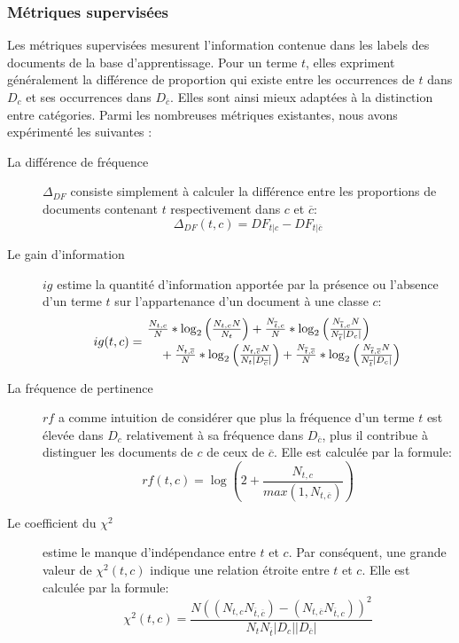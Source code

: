 \subsubsection{Métriques supervisées}
\label{sec:quanta:poids-globaux-superv}
Les métriques supervisées mesurent l'information contenue dans les labels des documents de la base d'apprentissage. Pour un terme $t$, elles expriment généralement la différence de proportion qui existe entre les occurrences de $t$ dans $D_c$ et ses occurrences dans $D_{\overline{c}}$. Elles sont ainsi mieux adaptées à la distinction entre catégories. Parmi les nombreuses métriques existantes, nous avons expérimenté les suivantes : 
\begin{description}
	\item[La différence de fréquence] $\Delta_{DF}$ consiste simplement à calculer la différence entre les proportions de documents contenant $t$ respectivement dans $c$ et $\overline{c}$:
	\[\Delta_{DF}(t,c) = DF_{t \vert c} - DF_{t \vert \overline{c}}\]
	\item[Le gain d'information] $ig$ \citep{yang1997IGandIMandCHIandTS} estime la quantité d'information apportée par la présence ou l'absence d'un terme $t$ sur l'appartenance d'un document à une classe $c$:
	\begin{equation*} %
	ig(t, c) = \splitdfrac{\frac{N_{t,c}}{N} * \log_2 \left(\frac{N_{t,c}N}{N_{t}}\right)
		 + \frac{N_{\overline{t},c}}{N} * \log_2 \left(\frac{N_{\overline{t},c}N}{N_{\overline{t}}\vert D_c \vert}\right)}
	{+ \frac{N_{t,\overline{c}}}{N} * \log_2 \left(\frac{N_{t,\overline{c}}N}{N_{t}\vert D_{\overline{c}}\vert}\right)
	+ \frac{N_{\overline{t},\overline{c}}}{N} * \log_2 \left(\frac{N_{\overline{t},\overline{c}}N}{N_{\overline{t}}\vert D_c \vert}\right)}
	\end{equation*}
	\item[La fréquence de pertinence] $rf$ \citep{lan2009rf} a comme intuition de considérer que  plus la fréquence d'un terme $t$ est élevée dans $D_c$ relativement à sa fréquence dans $D_{\overline{c}}$, plus il contribue à distinguer les documents de $c$ de ceux de $\overline{c}$. Elle est calculée par la formule:
	\[rf(t,c) = \log\left(2 + \frac{N_{t,c}}{max(1, N_{t,\overline{c}})}\right)\]
	\item[Le coefficient du $\chi^2$] \citep{schutze1995chi2} estime le manque d'indépendance entre $t$ et $c$. Par conséquent, une grande valeur de  $\chi^2(t,c)$ indique une relation étroite entre $t$ et $c$. Elle est calculée par la formule:
	\[\chi^2(t,c) = \frac{N ((N_{t,c} N_{\overline{t},\overline{c}}) - (N_{t,\overline{c}} N_{\overline{t},c}))^2}{N_t N_{\overline{t}} \vert D_c \vert  \vert D_{\overline{c}} \vert }\]

\end{description}
